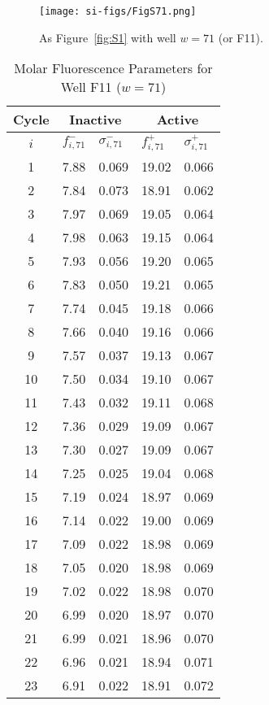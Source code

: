                 \begin{figure}
                    \centering
                    \texttt{[image: si-figs/FigS71.png]}
                    \caption{
                        As Figure~\ref{fig:S1} with well $w=71$ (or F11).
                    }
                \end{figure}
                \clearpage
    \begin{table}
        \caption{Molar Fluorescence Parameters for Well F11 ($w=71$)}
        \centering
        \begin{tabular}{c|ll|ll}
            Cycle & \multicolumn{2}{c|}{Inactive} & \multicolumn{2}{c}{Active} \\
            \hline
            $i$ & $f_{i,71}^{-}$ & $\sigma_{i,71}^{-}$ &  $f_{i,71}^{+}$ & $\sigma_{i,71}^{+}$ \\
            \hline
    1 & 7.88 & 0.069 & 19.02 & 0.066 \\
2 & 7.84 & 0.073 & 18.91 & 0.062 \\
3 & 7.97 & 0.069 & 19.05 & 0.064 \\
4 & 7.98 & 0.063 & 19.15 & 0.064 \\
5 & 7.93 & 0.056 & 19.20 & 0.065 \\
6 & 7.83 & 0.050 & 19.21 & 0.065 \\
7 & 7.74 & 0.045 & 19.18 & 0.066 \\
8 & 7.66 & 0.040 & 19.16 & 0.066 \\
9 & 7.57 & 0.037 & 19.13 & 0.067 \\
10 & 7.50 & 0.034 & 19.10 & 0.067 \\
11 & 7.43 & 0.032 & 19.11 & 0.068 \\
12 & 7.36 & 0.029 & 19.09 & 0.067 \\
13 & 7.30 & 0.027 & 19.09 & 0.067 \\
14 & 7.25 & 0.025 & 19.04 & 0.068 \\
15 & 7.19 & 0.024 & 18.97 & 0.069 \\
16 & 7.14 & 0.022 & 19.00 & 0.069 \\
17 & 7.09 & 0.022 & 18.98 & 0.069 \\
18 & 7.05 & 0.020 & 18.98 & 0.069 \\
19 & 7.02 & 0.022 & 18.98 & 0.070 \\
20 & 6.99 & 0.020 & 18.97 & 0.070 \\
21 & 6.99 & 0.021 & 18.96 & 0.070 \\
22 & 6.96 & 0.021 & 18.94 & 0.071 \\
23 & 6.91 & 0.022 & 18.91 & 0.072 \\

\end{tabular}
\end{table}
